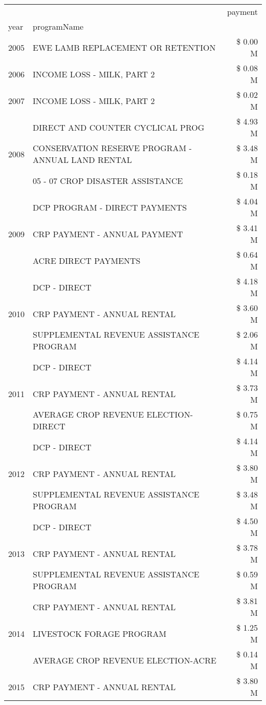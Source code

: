 \begin{tabular}{llr}
\toprule
 &  & payment \\
year & programName &  \\
\midrule
2005 & EWE LAMB REPLACEMENT OR RETENTION & \$ 0.00 M \\
\cline{1-3}
2006 & INCOME LOSS - MILK, PART 2 & \$ 0.08 M \\
\cline{1-3}
2007 & INCOME LOSS - MILK, PART 2 & \$ 0.02 M \\
\cline{1-3}
\multirow[t]{3}{*}{2008} & DIRECT AND COUNTER CYCLICAL PROG & \$ 4.93 M \\
 & CONSERVATION RESERVE PROGRAM - ANNUAL LAND RENTAL & \$ 3.48 M \\
 & 05 - 07 CROP DISASTER ASSISTANCE & \$ 0.18 M \\
\cline{1-3}
\multirow[t]{3}{*}{2009} & DCP PROGRAM - DIRECT PAYMENTS & \$ 4.04 M \\
 & CRP PAYMENT - ANNUAL PAYMENT & \$ 3.41 M \\
 & ACRE DIRECT PAYMENTS & \$ 0.64 M \\
\cline{1-3}
\multirow[t]{3}{*}{2010} & DCP - DIRECT & \$ 4.18 M \\
 & CRP PAYMENT - ANNUAL RENTAL & \$ 3.60 M \\
 & SUPPLEMENTAL REVENUE ASSISTANCE PROGRAM & \$ 2.06 M \\
\cline{1-3}
\multirow[t]{3}{*}{2011} & DCP - DIRECT & \$ 4.14 M \\
 & CRP PAYMENT - ANNUAL RENTAL & \$ 3.73 M \\
 & AVERAGE CROP REVENUE ELECTION-DIRECT & \$ 0.75 M \\
\cline{1-3}
\multirow[t]{3}{*}{2012} & DCP - DIRECT & \$ 4.14 M \\
 & CRP PAYMENT - ANNUAL RENTAL & \$ 3.80 M \\
 & SUPPLEMENTAL REVENUE ASSISTANCE PROGRAM & \$ 3.48 M \\
\cline{1-3}
\multirow[t]{3}{*}{2013} & DCP - DIRECT & \$ 4.50 M \\
 & CRP PAYMENT - ANNUAL RENTAL & \$ 3.78 M \\
 & SUPPLEMENTAL REVENUE ASSISTANCE PROGRAM & \$ 0.59 M \\
\cline{1-3}
\multirow[t]{3}{*}{2014} & CRP PAYMENT - ANNUAL RENTAL & \$ 3.81 M \\
 & LIVESTOCK FORAGE PROGRAM & \$ 1.25 M \\
 & AVERAGE CROP REVENUE ELECTION-ACRE & \$ 0.14 M \\
\cline{1-3}
\multirow[t]{3}{*}{2015} & CRP PAYMENT - ANNUAL RENTAL & \$ 3.80 M \\

\end{tabular}
